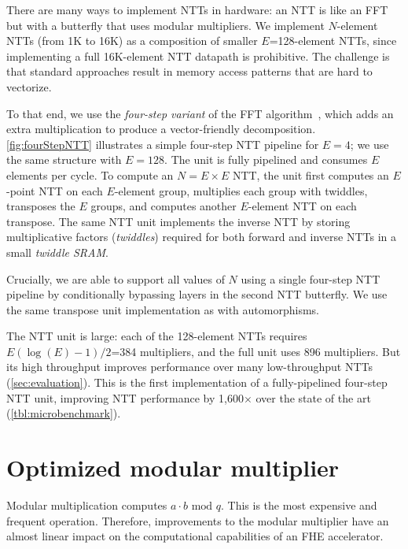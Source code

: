 There are many ways to implement NTTs in hardware:
an NTT is like an FFT~\cite{cooley:moc65:algorithm}
but with a butterfly that uses modular multipliers.
We implement $N$-element NTTs (from 1K to 16K) as a composition
of smaller $E$=128-element NTTs,
since implementing a full 16K-element NTT datapath is prohibitive.
The challenge is that standard approaches result in memory access patterns
that are hard to vectorize.

To that end, we use the \textit{four-step variant} of the FFT algorithm~\cite{bailey:supercomputing89:FFTs},
which adds an extra multiplication to produce a vector-friendly decomposition.
\autoref{fig:fourStepNTT} illustrates a simple four-step NTT pipeline for $E=4$;
we use the same structure with $E=128$.
The unit is fully pipelined and consumes $E$ elements per cycle.
To compute an $N=E\times E$ NTT, the unit first computes an $E$-point NTT on each $E$-element group,
multiplies each group with twiddles,
transposes the $E$ groups, and computes another $E$-element NTT on each transpose.
The same NTT unit implements the inverse NTT
by storing multiplicative factors (\textit{twiddles}) required for both forward and inverse NTTs in a small \textit{twiddle SRAM}.

Crucially, we are able to support all values of $N$ using a single four-step NTT pipeline by conditionally bypassing layers in the second NTT butterfly.
We use the same transpose unit implementation as with automorphisms.

The NTT unit is large: each of the 128-element NTTs requires $E(\log (E)-1)/2$=384 multipliers,
and the full unit uses 896 multipliers.
But its high throughput improves performance over many low-throughput NTTs (\autoref{sec:evaluation}). %
This is the first implementation of a fully-pipelined four-step NTT unit, 
improving NTT performance by 1,600$\times$ over the state of the art (\autoref{tbl:microbenchmark}).


\section{Optimized modular multiplier}\label{sec:modMult}
\tblModMult

Modular multiplication computes $a\cdot b \textrm{ mod } q$.
This is the most expensive and frequent operation.
Therefore, improvements to the modular multiplier have an almost
linear impact on the computational capabilities of an FHE accelerator.

